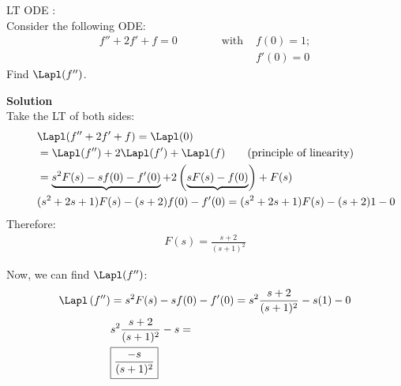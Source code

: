 \begin{exmp}{LT ODE :}\\
Consider the following ODE:
\begin{align*}
f''+2f'+f=0 \qquad \qquad \text{with } &f(0)=1; \\
&f'(0)=0
\end{align*}
Find $\Lapl(f'')$.

\textbf{Solution}\\
Take the LT of both sides:
\begin{align*}
\qquad & \Lapl(f''+2f'+f)=\Lapl(0)\\
&=\Lapl(f'')+2\Lapl(f')+\Lapl(f) \qquad \text{(principle of linearity)}\\
&=\underbrace{s^2 F(s) - sf(0)-f'(0)} +2\left(\underbrace{sF(s) - f(0)}\right) +F(s)\\
&(s^2+2s+1)F(s)-(s+2)f(0)-f'(0)=(s^2+2s+1)F(s)-(s+2)1-0\\
\end{align*}
Therefore:
\begin{align*}
F(s)=\frac{s+2}{(s+1)^2}
\end{align*}

Now, we can find $\Lapl(f'')$:
\begin{align*}
\Lapl \left(f''\right)&= s^2F(s)-s f(0)-f'(0) = s^2 \frac{s+2}{(s+1)^2}-s(1)-0\\
&s^2\frac{s+2}{(s+1)^2} -s=\\
&\boxed{\frac{-s}{(s+1)^2}}
\end{align*}
\end{exmp}
